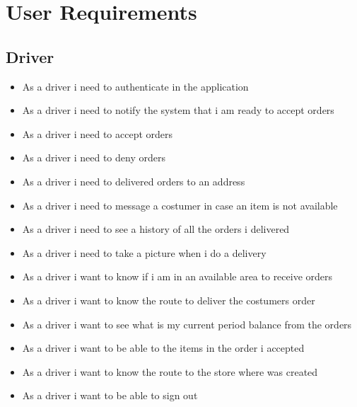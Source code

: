 \section{User Requirements}
\subsection{Driver}
\begin{itemize}
    \item As a driver i need to authenticate in the application
    \item As a driver i need to notify the system that i am ready to 
    accept orders
    \item As a driver i need to accept orders
    \item As a driver i need to deny orders
    \item As a driver i need to delivered orders to an address
    \item As a driver i need to message a costumer in case an item is 
    not available
    \item As a driver i need to see a history of all the orders i delivered
    \item As a driver i need to take a picture when i do a delivery
    \item As a driver i want to know if i am in an available area to 
    receive orders
    \item As a driver i want to know the route to deliver the costumers order
    \item As a driver i want to see what is my current period balance from 
    the orders
    \item As a driver i want to be able to the items in the order i accepted
    \item As a driver i want to know the route to the store where was created
    \item As a driver i want to be able to sign out
\end{itemize}
